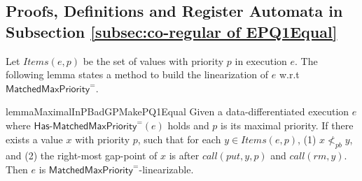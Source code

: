 \subsection{Proofs, Definitions and Register Automata in Subsection \ref{subsec:co-regular of EPQ1Equal}}
\label{sec:appendix proof and definition in section co-regular of EPQ1Equal}

Let $\textit{Items}(e,p)$ be the set of values with priority $p$ in execution $e$. The following lemma states a method to build the linearization of $e$ w.r.t $\mathsf{MatchedMaxPriority}^{=}$.

\begin{restatable}{lemma}{MaximalInPBadGPMakePQ1Equal}
\label{lemma:maximal in pb and gap-point make a candidate of EPQ1Equal}
Given a data-differentiated execution $e$ where $\mathsf{Has\text{-}MatchedMaxPriority}^{=}(e)$ holds and $p$ is its maximal priority. If there exists a value $x$ with priority $p$, such that for each $y \in \textit{Items}(e,p)$, (1) $x\not<_{\textit{pb}}y$, and (2) the right-most gap-point of $x$ is after $\textit{call}(\textit{put},y,p)$ and $\textit{call}(\textit{rm},y)$. Then $e$ is $\mathsf{MatchedMaxPriority}^{=}$-linearizable.
\end{restatable}

